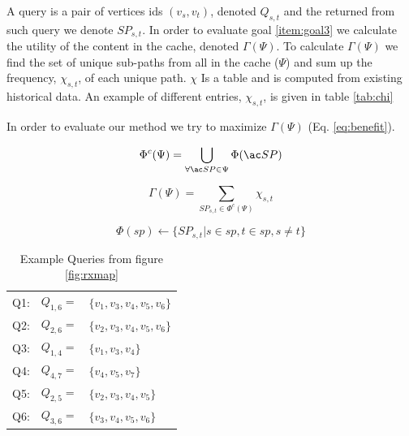 A query is a pair of vertices ids $(v_s, v_t)$, denoted $Q_{s,t}$ and the \spath returned from such query we denote $SP_{s,t}$. 
In order to evaluate goal \ref{item:goal3} we calculate the utility of the content in the cache, denoted $\Gamma(\Psi)$. To calculate $\Gamma(\Psi)$ we find the set of unique sub-paths from all \spaths in the cache ($\Psi$) and sum up the frequency, $\chi_{s,t}$, of each unique path.
$\chi$ Is a table and is computed from existing historical data. An example of different entries, $\chi_{s,t}$, is given in table \ref{tab:chi}

In order to evaluate our method we try to maximize $\Gamma(\Psi)$ (Eq. \ref{eq:benefit}).


\begin{equation} \label{eq:upsi}
 \Phi^c(\Psi) = \bigcup\limits_{\forall \spath \in \Psi} \Phi(\spath)
\end{equation}

\begin{equation} \label{eq:benefit}
\Gamma(\Psi) = \sum\limits_{SP_{s,t} \in \Phi^c(\Psi)} \chi_{s,t}
\end{equation}

\begin{equation} \label{eq:phi}
\Phi(sp) \leftarrow \{ SP_{s,t} | s \in sp, t \in sp, s \neq t\}
\end{equation}


\begin{table}
\begin{tabular}{l l p{}}
Q1:	&	$Q_{1,6} =$ 	& $\{v_1,v_3,v_4,v_5,v_6\}$\\
Q2:	&	$Q_{2,6} =$ 	& $\{v_2,v_3,v_4,v_5,v_6\}$ \\
Q3:	&	$Q_{1,4} =$ 	& $\{v_1,v_3,v_4\}$ \\
Q4:	&	$Q_{4,7} =$ 	& $\{v_4,v_5,v_7\}$ \\
Q5:	&	$Q_{2,5} =$ 	& $\{v_2,v_3,v_4,v_5\}$ \\
Q6:	&	$Q_{3,6} =$ 	& $\{v_3,v_4,v_5,v_6\}$ \\
\end{tabular}
\caption{Example Queries from figure \ref{fig:rxmap}}
\label{tab:queries}
\end{table}

